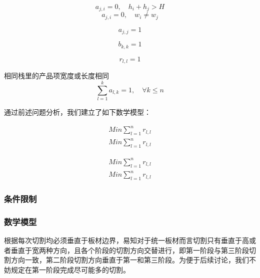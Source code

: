 \documentclass[bwprint]{gmcmthesis}
\begin{document}
\begin{equation}
    a_{j,i}=0, \quad   h_{i}+h_{j}>H
\end{equation}
\begin{equation}
    a_{j,i}=0, \quad  w_{i} \ne w_{j}
\end{equation}


\begin{equation}
    a_{j,j}=1
\end{equation}


\begin{equation}
    b_{k,k}=1
\end{equation}

\begin{equation}
    r_{l,l}=1
\end{equation}












相同栈里的产品项宽度或长度相同
\begin{equation}
    \sum_{l=1}^{k} a_{l,k}=1,\quad \forall k\leqslant n
\end{equation}  


通过前述问题分析，我们建立了如下数学模型：

\begin{equation}
    \begin{aligned}
    Min \sum_{l=1}^{n} r_{l,l}\\
    Min \sum_{l=1}^{n} r_{l,l}
    \end{aligned}
\end{equation}  


\begin{equation}
    \begin{aligned}
    Min \sum_{l=1}^{n} r_{l,l}\\
    Min \sum_{l=1}^{n} r_{l,l}
    \end{aligned}
\end{equation}  

\subsubsection{条件限制}

\subsubsection{数学模型}

根据每次切割均必须垂直于板材边界，易知对于统一板材而言切割只有垂直于高或者垂直于宽两种方向，且各个阶段的切割方向交替进行，即第一阶段与第三阶段切割方向一致，第二阶段切割方向垂直于第一和第三阶段。为便于后续讨论，我们不妨规定在第一阶段完成尽可能多的切割。
\end{document}
